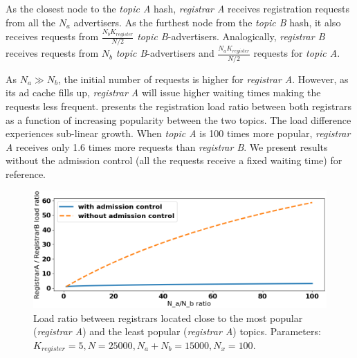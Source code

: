 As the closest node to the \emph{topic A} hash, \emph{registrar A} receives registration requests from all the $N_a$ advertisers. As the furthest node from the \emph{topic B} hash, it also receives requests from $\frac{N_{b}K_\textit{register}}{N/2}$ \emph{topic B}-advertisers. Analogically, \emph{registrar B} receives requests from $N_b$ \emph{topic B}-advertisers and $\frac{N_{a}K_\textit{register}}{N/2}$ requests for \emph{topic A}.

As $N_a \gg N_b$, the initial number of requests is higher for \emph{registrar A}. However, as its ad cache fills up, \emph{registrar A} will issue higher waiting times making the requests less frequent.  presents the registration load ratio between both registrars as a function of increasing popularity between the two topics. The load difference experiences sub-linear growth. When \emph{topic A} is 100 times more popular, \emph{registrar A} receives only 1.6 times more requests than \emph{registrar B}. We present results without the admission control (\ie all the requests receive a fixed waiting time) for reference.

\begin{figure}[t]
    \includegraphics[width=1\linewidth]{img/fairness_registration}
    \vspace{-0.05in}
    \caption{Load ratio between registrars located close to the most popular (\emph{registrar A}) and the least popular (\emph{registrar A}) topics.
	\protect{} Parameters: $K_\textit{register}=5, N=25000, N_a+N_b=15000, N_x=100$.}
    \label{fig:fairness_registration}
    \vspace{-0.15in}
\end{figure}

